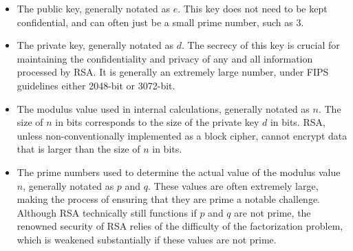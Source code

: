 \documentclass[11pt]{article}
\begin{document}
\begin{itemize}
\item
{The public key, generally notated as $e$. This key does not need to be kept confidential, and can often just be a small prime number, such as $3$.}
\item
{The private key, generally notated as $d$. The secrecy of this key is crucial for maintaining the confidentiality and privacy of any and all information processed by RSA. It is generally an extremely large number, under FIPS guidelines either 2048-bit or 3072-bit.}
\item
{The modulus value used in internal calculations, generally notated as $n$. The size of $n$ in bits corresponds to the size of the private key $d$ in bits. RSA, unless non-conventionally implemented as a block cipher, cannot encrypt data that is larger than the size of $n$ in bits.}
\item
{The prime numbers used to determine the actual value of the modulus value $n$, generally notated as $p$ and $q$. These values are often extremely large, making the process of ensuring that they are prime a notable challenge. Although RSA technically still functions if $p$ and $q$ are not prime, the renowned security of RSA relies of the difficulty of the factorization problem, which is weakened substantially if these values are not prime.}
\end{itemize}
\end{document}
